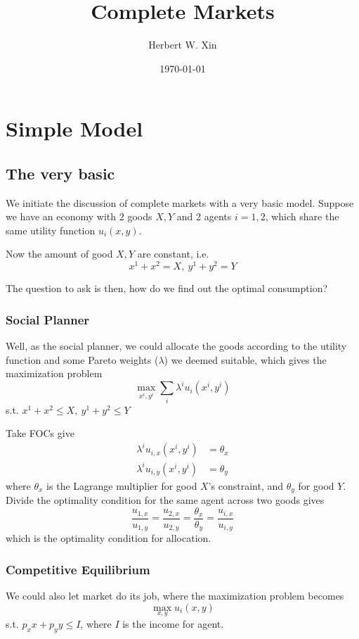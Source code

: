 \documentclass[twocolumn, fleqn]{article}
\numberwithin{equation}{section}
\begin{document}
	\title{Complete Markets}
	\author{Herbert W. Xin}
	\date{\today}
	\maketitle

	\tableofcontents
	\thispagestyle{fancy}
	
	\section{Simple Model}
	
	\subsection{The very basic}
	We initiate the discussion of complete markets with a very basic model. Suppose we have an economy with 2 goods $X,Y$ and 2 agents $i=1,2$, which share the same utility function \(u_i(x,y)\).
	
	Now the amount of good $X,Y$ are constant, i.e. 
	\[x^1 + x^2 =X, \ y^1 + y^2 =Y\]
	
	The question to ask is then, how do we find out the optimal consumption?
	
	\subsubsection{Social Planner}
	Well, as the social planner, we could allocate the goods according to the utility function and some Pareto weights ($\lambda$) we deemed suitable, which gives the maximization problem 
	\[ \max_{x^i, y^i} \sum_i \lambda^i u_i(x^i, y^i)\]
	s.t. \(x^1 + x^2 \leq X, \ y^1 + y^2 \leq Y\)
	
	\vspace{2mm}
	Take FOCs give
	\begin{align*}
		\lambda^i u_{i,x} (x^i, y^i) &= \theta_x\\
		\lambda^i u_{i,y} (x^i, y^i) &= \theta_y
	\end{align*}
	where $\theta_x$ is the Lagrange multiplier for good $X$'s constraint, and $\theta_y$ for good $Y$. 
	Divide the optimality condition for the same agent across two goods gives
	\[\frac{u_{1,x}}{u_{1,y}} = \frac{u_{2,x}}{u_{2,y}} = \frac{\theta_x}{\theta_y}=\frac{u_{i,x}}{u_{i,y}}\]
	which is the optimality condition for allocation.
	
	\subsubsection{Competitive Equilibrium}
	We could also let market do its job, where the maximization problem becomes
	\[\max_{x, y}  u_i(x, y)\]
	s.t. $p_x x +p_y y\leq I$, where $I$ is the income for agent.
	
\end{document}
